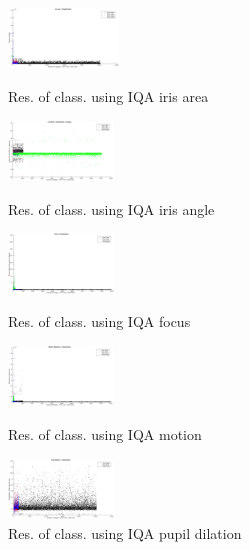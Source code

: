 \begin{figure}[h]
	\begin{minipage}{0.48\linewidth}
		\centering
		\includegraphics[width=0.9\linewidth, height=1.6cm]{pics/iqa_clas_area}
		\caption{Res. of class. using IQA iris area}
		\label{fig:clas_ia}
	\end{minipage}
	\hfill
	\begin{minipage}{0.48\linewidth}
		\centering
		\includegraphics[width=0.9\linewidth, height=1.6cm]{pics/iqa_clas_iris_angle}
		\caption{Res. of class. using IQA iris angle}
		\label{fig:clas_ang}
	\end{minipage}
	\begin{minipage}{0.48\linewidth}
		\centering
		\includegraphics[width=0.9\linewidth, height=1.6cm]{pics/iqa_clas_focus}
		\caption{Res. of class. using IQA focus}
		\label{fig:clas_f}
	\end{minipage}
	\hfill
	\begin{minipage}{0.48\linewidth}
		\centering
		\includegraphics[width=0.9\linewidth, height=1.6cm]{pics/iqa_clas_motion}
		\caption{Res. of class. using IQA motion}
		\label{fig:clas_mot}
	\end{minipage}
	\begin{minipage}{0.48\linewidth}
		\centering
		\includegraphics[width=0.9\linewidth, height=1.6cm]{pics/iqa_clas_pup_dial}
		\caption{Res. of class. using IQA pupil dilation}
		\label{fig:clas_pd}
	\end{minipage}

\end{figure}
